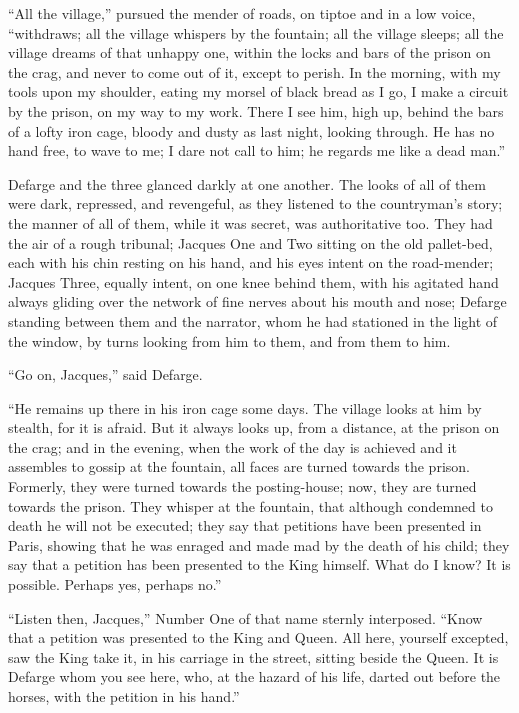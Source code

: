 ``All the village,'' pursued the mender of roads, on tiptoe and in a
low voice, ``withdraws; all the village whispers by the fountain;
all the village sleeps; all the village dreams of that unhappy one,
within the locks and bars of the prison on the crag, and never to come
out of it, except to perish.  In the morning, with my tools upon my
shoulder, eating my morsel of black bread as I go, I make a circuit
by the prison, on my way to my work.  There I see him, high up,
behind the bars of a lofty iron cage, bloody and dusty as last night,
looking through.  He has no hand free, to wave to me; I dare not call
to him; he regards me like a dead man.''

Defarge and the three glanced darkly at one another.  The looks of
all of them were dark, repressed, and revengeful, as they listened to
the countryman's story; the manner of all of them, while it was secret,
was authoritative too.  They had the air of a rough tribunal; Jacques
One and Two sitting on the old pallet-bed, each with his chin resting
on his hand, and his eyes intent on the road-mender; Jacques Three,
equally intent, on one knee behind them, with his agitated hand always
gliding over the network of fine nerves about his mouth and nose;
Defarge standing between them and the narrator, whom he had stationed
in the light of the window, by turns looking from him to them, and
from them to him.

``Go on, Jacques,'' said Defarge.

``He remains up there in his iron cage some days.  The village looks
at him by stealth, for it is afraid.  But it always looks up, from
a distance, at the prison on the crag; and in the evening, when the
work of the day is achieved and it assembles to gossip at the fountain,
all faces are turned towards the prison.  Formerly, they were turned
towards the posting-house; now, they are turned towards the prison.
They whisper at the fountain, that although condemned to death he will
not be executed; they say that petitions have been presented in Paris,
showing that he was enraged and made mad by the death of his child;
they say that a petition has been presented to the King himself.
What do I know?  It is possible.  Perhaps yes, perhaps no.''

``Listen then, Jacques,'' Number One of that name sternly interposed.
``Know that a petition was presented to the King and Queen.  All here,
yourself excepted, saw the King take it, in his carriage in the street,
sitting beside the Queen.  It is Defarge whom you see here, who,
at the hazard of his life, darted out before the horses, with the
petition in his hand.''


